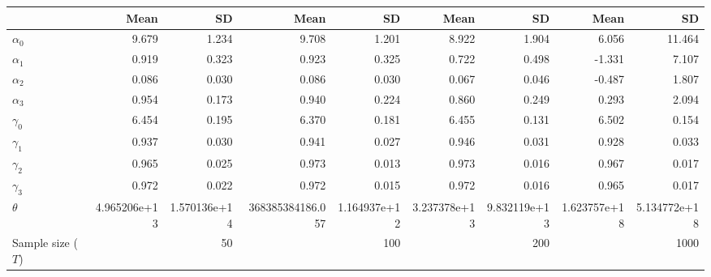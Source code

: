 
\begin{tabular}[t]{lrrrrrrrr}
\toprule
  & Mean & SD & Mean  & SD  & Mean   & SD   & Mean    & SD   \\
\midrule
$\alpha_{0}$ & 9.679 & 1.234 & 9.708 & 1.201 & 8.922 & 1.904 & 6.056 & 11.464\\
$\alpha_{1}$ & 0.919 & 0.323 & 0.923 & 0.325 & 0.722 & 0.498 & -1.331 & 7.107\\
$\alpha_{2}$ & 0.086 & 0.030 & 0.086 & 0.030 & 0.067 & 0.046 & -0.487 & 1.807\\
$\alpha_{3}$ & 0.954 & 0.173 & 0.940 & 0.224 & 0.860 & 0.249 & 0.293 & 2.094\\
$\gamma_{0}$ & 6.454 & 0.195 & 6.370 & 0.181 & 6.455 & 0.131 & 6.502 & 0.154\\
$\gamma_{1}$ & 0.937 & 0.030 & 0.941 & 0.027 & 0.946 & 0.031 & 0.928 & 0.033\\
$\gamma_{2}$ & 0.965 & 0.025 & 0.973 & 0.013 & 0.973 & 0.016 & 0.967 & 0.017\\
$\gamma_{3}$ & 0.972 & 0.022 & 0.972 & 0.015 & 0.972 & 0.016 & 0.965 & 0.017\\
$\theta$ & 4.965206e+13 & 1.570136e+14 & 368385384186.057 & 1.164937e+12 & 3.237378e+13 & 9.832119e+13 & 1.623757e+18 & 5.134772e+18\\
Sample size ($T$) &  & 50 &  & 100 &  & 200 &  & 1000\\
\bottomrule
\end{tabular}
